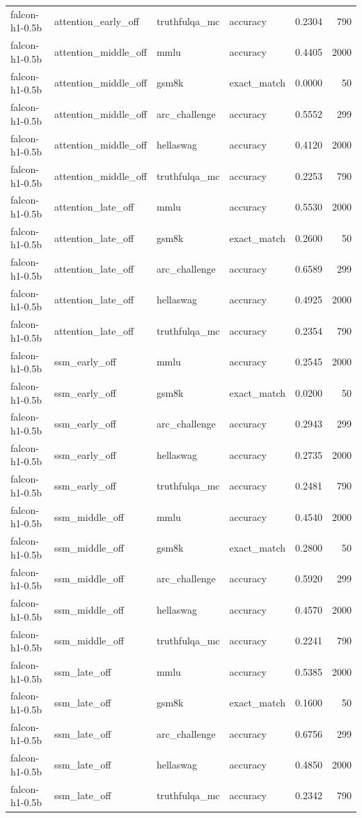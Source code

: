 \begin{tabular}{llllrr}
falcon-h1-0.5b & attention_early_off & truthfulqa_mc & accuracy & 0.2304 & 790 \\
falcon-h1-0.5b & attention_middle_off & mmlu & accuracy & 0.4405 & 2000 \\
falcon-h1-0.5b & attention_middle_off & gsm8k & exact_match & 0.0000 & 50 \\
falcon-h1-0.5b & attention_middle_off & arc_challenge & accuracy & 0.5552 & 299 \\
falcon-h1-0.5b & attention_middle_off & hellaswag & accuracy & 0.4120 & 2000 \\
falcon-h1-0.5b & attention_middle_off & truthfulqa_mc & accuracy & 0.2253 & 790 \\
falcon-h1-0.5b & attention_late_off & mmlu & accuracy & 0.5530 & 2000 \\
falcon-h1-0.5b & attention_late_off & gsm8k & exact_match & 0.2600 & 50 \\
falcon-h1-0.5b & attention_late_off & arc_challenge & accuracy & 0.6589 & 299 \\
falcon-h1-0.5b & attention_late_off & hellaswag & accuracy & 0.4925 & 2000 \\
falcon-h1-0.5b & attention_late_off & truthfulqa_mc & accuracy & 0.2354 & 790 \\
falcon-h1-0.5b & ssm_early_off & mmlu & accuracy & 0.2545 & 2000 \\
falcon-h1-0.5b & ssm_early_off & gsm8k & exact_match & 0.0200 & 50 \\
falcon-h1-0.5b & ssm_early_off & arc_challenge & accuracy & 0.2943 & 299 \\
falcon-h1-0.5b & ssm_early_off & hellaswag & accuracy & 0.2735 & 2000 \\
falcon-h1-0.5b & ssm_early_off & truthfulqa_mc & accuracy & 0.2481 & 790 \\
falcon-h1-0.5b & ssm_middle_off & mmlu & accuracy & 0.4540 & 2000 \\
falcon-h1-0.5b & ssm_middle_off & gsm8k & exact_match & 0.2800 & 50 \\
falcon-h1-0.5b & ssm_middle_off & arc_challenge & accuracy & 0.5920 & 299 \\
falcon-h1-0.5b & ssm_middle_off & hellaswag & accuracy & 0.4570 & 2000 \\
falcon-h1-0.5b & ssm_middle_off & truthfulqa_mc & accuracy & 0.2241 & 790 \\
falcon-h1-0.5b & ssm_late_off & mmlu & accuracy & 0.5385 & 2000 \\
falcon-h1-0.5b & ssm_late_off & gsm8k & exact_match & 0.1600 & 50 \\
falcon-h1-0.5b & ssm_late_off & arc_challenge & accuracy & 0.6756 & 299 \\
falcon-h1-0.5b & ssm_late_off & hellaswag & accuracy & 0.4850 & 2000 \\
falcon-h1-0.5b & ssm_late_off & truthfulqa_mc & accuracy & 0.2342 & 790 \\
\bottomrule
\end{tabular}
